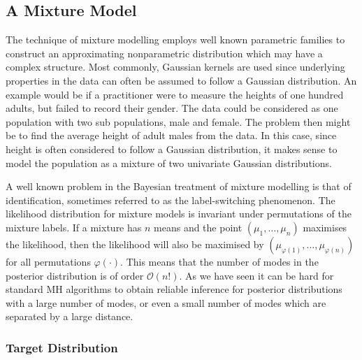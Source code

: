\documentclass[final]{siamltex}
\begin{document}

\subsection{A Mixture Model}\label{sec:mixture}

The technique of mixture modelling employs well known parametric
families to construct an approximating nonparametric distribution
which may have a complex structure. Most commonly, Gaussian kernels
are used since underlying properties in the data can often be assumed
to follow a Gaussian distribution. An example would be if a
practitioner were to measure the heights of one hundred adults, but
failed to record their gender. The data could be considered as one
population with two sub populations, male and female. The problem then
might be to find the average height of adult males from the data. In
this case, since height is often considered to follow a Gaussian
distribution, it makes sense to model the population as a mixture of
two univariate Gaussian distributions.

A well known problem in the Bayesian treatment of mixture modelling is
that of identification, sometimes referred to as the label-switching
phenomenon. The likelihood distribution for mixture models is
invariant under permutations of the mixture labels. If a mixture has
$n$ means and the point $(\mu_1, \dots, \mu_n)$ maximises the
likelihood, then the likelihood will also be maximised by
$(\mu_{\varphi(1)}, \dots, \mu_{\varphi(n)})$ for all permutations
$\varphi(\cdot)$. This means that the number of modes in the posterior
distribution is of order $\mathcal{O}(n!)$. As we have seen it can be
hard for standard MH algorithms to obtain reliable inference for
posterior distributions with a large number of modes, or even a small
number of modes which are separated by a large distance.

\subsubsection{Target Distribution}\label{sec:mixture_target}
\end{document}
